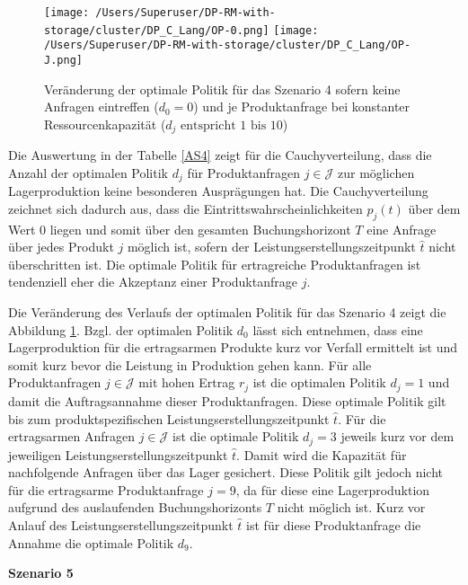 \begin{figure}[h!]     
\begin{center}
\texttt{[image: /Users/Superuser/DP-RM-with-storage/cluster/DP\_C\_Lang/OP-0.png]}
\texttt{[image: /Users/Superuser/DP-RM-with-storage/cluster/DP\_C\_Lang/OP-J.png]}
    \caption{Veränderung der optimale Politik für das Szenario 4 sofern keine Anfragen eintreffen ($d_0=0$) und je Produktanfrage bei konstanter Ressourcenkapazität ($d_j\text{ entspricht }1\text{ bis }10$)}  \label{SV4}
  \end{center}
\end{figure}

Die Auswertung in der Tabelle \ref{AS4} zeigt für die Cauchyverteilung, dass die Anzahl der optimalen Politik $d_j$ für Produktanfragen $j\in\mathcal{J}$ zur möglichen Lagerproduktion keine besonderen Ausprägungen hat. Die Cauchyverteilung zeichnet sich dadurch aus, dass die Eintrittswahrscheinlichkeiten $p_j(t)$ über dem Wert $0$ liegen und somit über den gesamten Buchungshorizont $T$ eine Anfrage über jedes Produkt $j$ möglich ist, sofern der Leistungserstellungszeitpunkt $\hat t$ nicht überschritten ist. Die optimale Politik für ertragreiche Produktanfragen ist tendenziell eher die Akzeptanz einer Produktanfrage $j$.

Die Veränderung des Verlaufs der optimalen Politik für das Szenario 4 zeigt die Abbildung \ref{SV4}. Bzgl. der optimalen Politik $d_0$ lässt sich entnehmen, dass eine Lagerproduktion für die ertragsarmen Produkte kurz vor Verfall ermittelt ist und somit kurz bevor die Leistung in Produktion gehen kann. Für alle Produktanfragen $j\in\mathcal{J}$ mit hohen Ertrag $r_j$ ist die optimalen Politik $d_j=1$ und damit die Auftragsannahme dieser Produktanfragen. Diese optimale Politik gilt bis zum produktspezifischen Leistungserstellungszeitpunkt $\hat t$. Für die ertragsarmen Anfragen $j\in\mathcal{J}$ ist die optimale Politik $d_j=3$ jeweils kurz vor dem jeweiligen Leistungserstellungszeitpunkt $\hat t$. Damit wird die Kapazität für nachfolgende Anfragen über das Lager gesichert. Diese Politik gilt jedoch nicht für die ertragsarme Produktanfrage $j=9$, da für diese eine Lagerproduktion aufgrund des auslaufenden Buchungshorizonts $T$ nicht möglich ist. Kurz vor Anlauf des Leistungserstellungszeitpunkt $\hat t$ ist für diese Produktanfrage die Annahme die optimale Politik $d_9$.

\textbf{Szenario 5}


